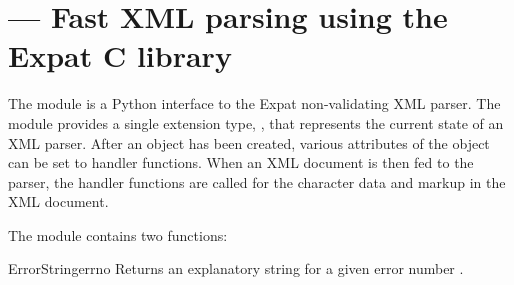 \section{ ---
         Fast XML parsing using the Expat C library}


The  module is a Python interface to the Expat
non-validating XML parser.
The module provides a single extension type, , that
represents the current state of an XML parser.  After an
 object has been created, various attributes of the object 
can be set to handler functions.  When an XML document is then fed to
the parser, the handler functions are called for the character data
and markup in the XML document.
 
The  module contains two functions:

\begin{funcdesc}{ErrorString}{errno}
Returns an explanatory string for a given error number .
\end{funcdesc}

